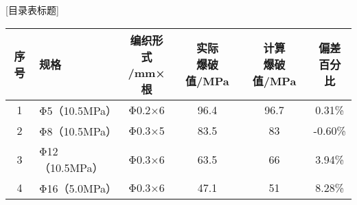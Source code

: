 \begin{table}[!htbp]
	\centering
	[目录表标题]
	\label{tab:strength-of-hose}
	\begin{tabular}{@{\extracolsep{\fill}}>{\hspace{0.5cm}}clcccc}
		\toprule
		序号 &    规格     & \tabincell{c}{编织形式\\/mm×根 }& \tabincell{c}{实际\\爆破值/MPa }& \tabincell{c}{计算\\爆破值/MPa}& \tabincell{c}{偏差\\百分比}  \\ \midrule
		1  & Φ5（10.5MPa）  & Φ0.2×6  &   96.4    & 96.7          & 0.31\% \\
		2  & Φ8（10.5MPa）  & Φ0.3×5  &   83.5    & 83          & -0.60\% \\
		3  & Φ12（10.5MPa） & Φ0.3×6  &   63.5    & 66          & 3.94\%  \\
		4  & Φ16（5.0MPa）  & Φ0.3×6  &   47.1    & 51          & 8.28\% \\ \bottomrule
	\end{tabular} 
\end{table}  








